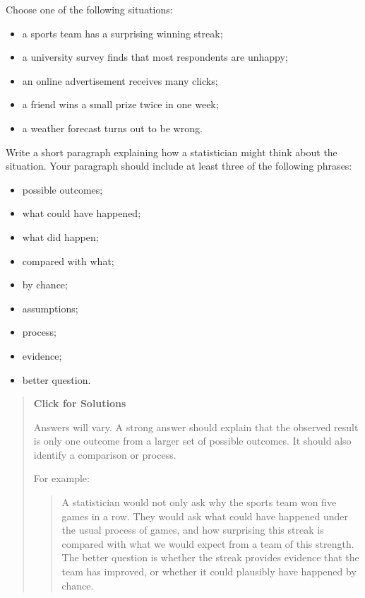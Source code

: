\documentclass[
  letterpaper,
  DIV=11,
  numbers=noendperiod]{scrreprt}
\providecommand{\tightlist}{%
  \setlength{\itemsep}{0pt}\setlength{\parskip}{0pt}}
\begin{document}
\begin{tcolorbox}[enhanced jigsaw, arc=.35mm, bottomrule=.15mm, bottomtitle=1mm, breakable, colback=white, colbacktitle=quarto-callout-note-color!10!white, colframe=quarto-callout-note-color-frame, coltitle=black, left=2mm, leftrule=.75mm, opacityback=0, opacitybacktitle=0.6, rightrule=.15mm, title=\textcolor{quarto-callout-note-color}{\faInfo}\hspace{0.5em}{Question 17}, titlerule=0mm, toprule=.15mm, toptitle=1mm]

Choose one of the following situations:

\begin{itemize}
\tightlist
\item
  a sports team has a surprising winning streak;
\item
  a university survey finds that most respondents are unhappy;
\item
  an online advertisement receives many clicks;
\item
  a friend wins a small prize twice in one week;
\item
  a weather forecast turns out to be wrong.
\end{itemize}

Write a short paragraph explaining how a statistician might think about
the situation. Your paragraph should include at least three of the
following phrases:

\begin{itemize}
\tightlist
\item
  possible outcomes;
\item
  what could have happened;
\item
  what did happen;
\item
  compared with what;
\item
  by chance;
\item
  assumptions;
\item
  process;
\item
  evidence;
\item
  better question.
\end{itemize}

\begin{quote}
\textbf{Click for Solutions}

Answers will vary. A strong answer should explain that the observed
result is only one outcome from a larger set of possible outcomes. It
should also identify a comparison or process.

For example:

\begin{quote}
A statistician would not only ask why the sports team won five games in
a row. They would ask what could have happened under the usual process
of games, and how surprising this streak is compared with what we would
expect from a team of this strength. The better question is whether the
streak provides evidence that the team has improved, or whether it could
plausibly have happened by chance.
\end{quote}
\end{quote}

\end{tcolorbox}
\end{document}
